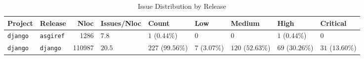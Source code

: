 \begin{table}
\caption{Issue Distribution by Release}
\label{tab:issue-release-distribution}
\begin{tabular}{llrllllll}
\toprule
Project & Release & Nloc & Issues/Nloc & Count & Low & Medium & High & Critical \\
\midrule
\texttt{django} & \texttt{asgiref} & 1286 & $7.8$ & $1$ ($0.44\%$) & $0$ & $0$ & $1$ ($0.44\%$) & $0$ \\
\texttt{django} & \texttt{django} & 110987 & $20.5$ & $227$ ($99.56\%$) & $7$ ($3.07\%$) & $120$ ($52.63\%$) & $69$ ($30.26\%$) & $31$ ($13.60\%$) \\
\bottomrule
\end{tabular}
\end{table}
